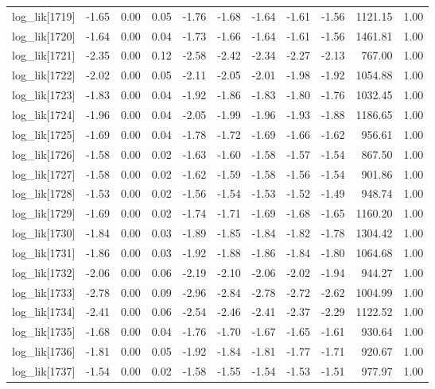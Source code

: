 \begin{table}[ht]
\begin{tabular}{rrrrrrrrrrr}
  log\_lik[1719] & -1.65 & 0.00 & 0.05 & -1.76 & -1.68 & -1.64 & -1.61 & -1.56 & 1121.15 & 1.00 \\ 
  log\_lik[1720] & -1.64 & 0.00 & 0.04 & -1.73 & -1.66 & -1.64 & -1.61 & -1.56 & 1461.81 & 1.00 \\ 
  log\_lik[1721] & -2.35 & 0.00 & 0.12 & -2.58 & -2.42 & -2.34 & -2.27 & -2.13 & 767.00 & 1.00 \\ 
  log\_lik[1722] & -2.02 & 0.00 & 0.05 & -2.11 & -2.05 & -2.01 & -1.98 & -1.92 & 1054.88 & 1.00 \\ 
  log\_lik[1723] & -1.83 & 0.00 & 0.04 & -1.92 & -1.86 & -1.83 & -1.80 & -1.76 & 1032.45 & 1.00 \\ 
  log\_lik[1724] & -1.96 & 0.00 & 0.04 & -2.05 & -1.99 & -1.96 & -1.93 & -1.88 & 1186.65 & 1.00 \\ 
  log\_lik[1725] & -1.69 & 0.00 & 0.04 & -1.78 & -1.72 & -1.69 & -1.66 & -1.62 & 956.61 & 1.00 \\ 
  log\_lik[1726] & -1.58 & 0.00 & 0.02 & -1.63 & -1.60 & -1.58 & -1.57 & -1.54 & 867.50 & 1.00 \\ 
  log\_lik[1727] & -1.58 & 0.00 & 0.02 & -1.62 & -1.59 & -1.58 & -1.56 & -1.54 & 901.86 & 1.00 \\ 
  log\_lik[1728] & -1.53 & 0.00 & 0.02 & -1.56 & -1.54 & -1.53 & -1.52 & -1.49 & 948.74 & 1.00 \\ 
  log\_lik[1729] & -1.69 & 0.00 & 0.02 & -1.74 & -1.71 & -1.69 & -1.68 & -1.65 & 1160.20 & 1.00 \\ 
  log\_lik[1730] & -1.84 & 0.00 & 0.03 & -1.89 & -1.85 & -1.84 & -1.82 & -1.78 & 1304.42 & 1.00 \\ 
  log\_lik[1731] & -1.86 & 0.00 & 0.03 & -1.92 & -1.88 & -1.86 & -1.84 & -1.80 & 1064.68 & 1.00 \\ 
  log\_lik[1732] & -2.06 & 0.00 & 0.06 & -2.19 & -2.10 & -2.06 & -2.02 & -1.94 & 944.27 & 1.00 \\ 
  log\_lik[1733] & -2.78 & 0.00 & 0.09 & -2.96 & -2.84 & -2.78 & -2.72 & -2.62 & 1004.99 & 1.00 \\ 
  log\_lik[1734] & -2.41 & 0.00 & 0.06 & -2.54 & -2.46 & -2.41 & -2.37 & -2.29 & 1122.52 & 1.00 \\ 
  log\_lik[1735] & -1.68 & 0.00 & 0.04 & -1.76 & -1.70 & -1.67 & -1.65 & -1.61 & 930.64 & 1.00 \\ 
  log\_lik[1736] & -1.81 & 0.00 & 0.05 & -1.92 & -1.84 & -1.81 & -1.77 & -1.71 & 920.67 & 1.00 \\ 
  log\_lik[1737] & -1.54 & 0.00 & 0.02 & -1.58 & -1.55 & -1.54 & -1.53 & -1.51 & 977.97 & 1.00 \\ 

\end{tabular}
\end{table}
